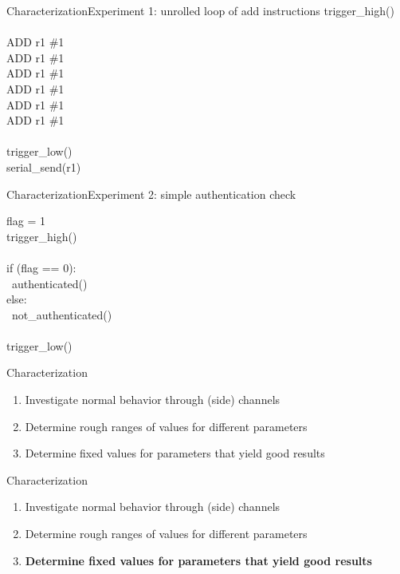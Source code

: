 \documentclass[table]{beamer}
\begin{document}
\begin{frame}{Characterization}{Experiment 1: unrolled loop of add instructions}
    trigger\_high() \\
    \ \\
    ADD r1 \#1 \\
    ADD r1 \#1 \\
    ADD r1 \#1 \\
    ADD r1 \#1 \\
    ADD r1 \#1 \\
    ADD r1 \#1 \\
    \ \\
    trigger\_low() \\
    serial\_send(r1) \\
\end{frame}

\begin{frame}{Characterization}{Experiment 2: simple authentication check}

    flag = 1 \\
    trigger\_high() \\
    \ \\
    if (flag == 0): \\
    \     authenticated() \\
    else: \\
    \     not\_authenticated() \\
    \ \\
    trigger\_low() \\
\end{frame}

\begin{frame}{Characterization}
    \begin{enumerate}
        \item Investigate normal behavior through (side) channels 
        \item Determine rough ranges of values for different parameters
        \item Determine fixed values for parameters that yield good results
    \end{enumerate}
\end{frame}

\begin{frame}{Characterization}
    \begin{enumerate}
        \item Investigate normal behavior through (side) channels 
        \item Determine rough ranges of values for different parameters
        \item \textbf{Determine fixed values for parameters that yield good results}
    \end{enumerate}
\end{frame}
\end{document}

